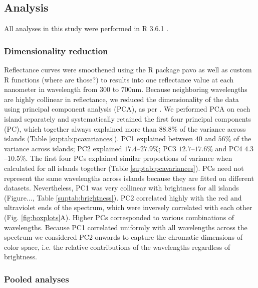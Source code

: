 \subsection*{Analysis}

All analyses in this study were performed in R 3.6.1 \citep{RCoreTeam2019}. 

\subsubsection*{Dimensionality reduction}

Reflectance curves were smoothened using the R package pavo \citep{Maia2013} as well as custom R functions (where are those?) to results into one reflectance value at each nanometer in wavelength from 300 to 700nm. Because neighboring wavelengths are highly collinear in reflectance, we reduced the dimensionality of the data using principal component analysis (PCA), as per \citet{Cuthill1999, Leal2002}. We performed PCA on each island separately and systematically retained the first four principal components (PC), which together always explained more than $88.8\%$ of the variance across islands (Table \ref{suptab:pcavariances}). PC1 explained between $40$ and $56$\% of the variance across islands; PC2 explained $17.4$--$27.9$\%; PC3 $12.7$--$17.6$\% and PC4 $4.3$--$10.5$\%. The first four PCs explained similar proportions of variance when calculated for all islands together (Table \ref{suptab:pcavariances}). PCs need not represent the same wavelengths across islands because they are fitted on different datasets. Nevertheless, PC1 was very collinear with brightness for all islands (Figure..., Table \ref{suptab:brightness}). PC2 correlated highly with the red and ultraviolet ends of the spectrum, which were inversely correlated with each other (Fig. \ref{fig:boxplots}A). Higher PCs corresponded to various combinations of wavelengths. Because PC1 correlated uniformly with all wavelengths across the spectrum  we considered PC2 onwards to capture the chromatic dimensions of color space, i.e. the relative contributions of the wavelengths regardless of brightness.

\subsubsection*{Pooled analyses}

